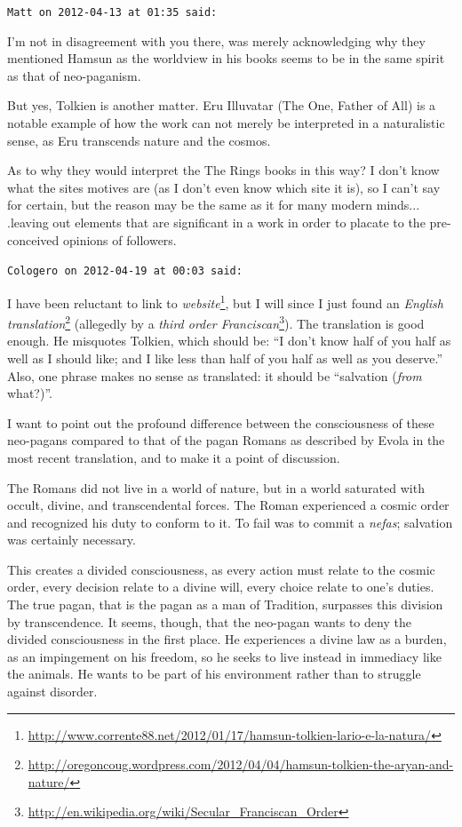 \begin{footnotesize}
\begin{sffamily}
\hfill

\texttt{Matt on 2012-04-13 at 01:35 said:}

I'm not in disagreement with you there, was merely acknowledging why they mentioned Hamsun as the worldview in his books seems to be in the same spirit as that of neo-paganism.

But yes, Tolkien is another matter. Eru Illuvatar (The One, Father of All) is a notable example of how the work can not merely be interpreted in a naturalistic sense, as Eru transcends nature and the cosmos.

As to why they would interpret the The Rings books in this way? I don't know what the sites motives are (as I don't even know which site it is), so I can't say for certain, but the reason may be the same as it for many modern minds... .leaving out elements that are significant in a work in order to placate to the pre-conceived opinions of followers.

\hfill

\texttt{Cologero on 2012-04-19 at 00:03 said:}

I have been reluctant to link to \textit{website}\footnote{\url{http://www.corrente88.net/2012/01/17/hamsun-tolkien-lario-e-la-natura/}}, but I will since I just found an \textit{English translation}\footnote{\url{http://oregoncoug.wordpress.com/2012/04/04/hamsun-tolkien-the-aryan-and-nature/}} (allegedly by a \textit{third order Franciscan}\footnote{\url{http://en.wikipedia.org/wiki/Secular_Franciscan_Order}}). The translation is good enough. He misquotes Tolkien, which should be: ``I don't know half of you half as well as I should like; and I like less than half of you half as well as you deserve.'' Also, one phrase makes no sense as translated: it should be ``salvation (\emph{from} what?)''.

I want to point out the profound difference between the consciousness of these neo-pagans compared to that of the pagan Romans as described by Evola in the most recent translation, and to make it a point of discussion.

The Romans did not live in a world of nature, but in a world saturated with occult, divine, and transcendental forces. The Roman experienced a cosmic order and recognized his duty to conform to it. To fail was to commit a \emph{nefas}; salvation was certainly necessary.

This creates a divided consciousness, as every action must relate to the cosmic order, every decision relate to a divine will, every choice relate to one's duties. The true pagan, that is the pagan as a man of Tradition, surpasses this division by transcendence. It seems, though, that the neo-pagan wants to deny the divided consciousness in the first place. He experiences a divine law as a burden, as an impingement on his freedom, so he seeks to live instead in immediacy like the animals. He wants to be part of his environment rather than to struggle against disorder.


\end{sffamily}
\end{footnotesize}
